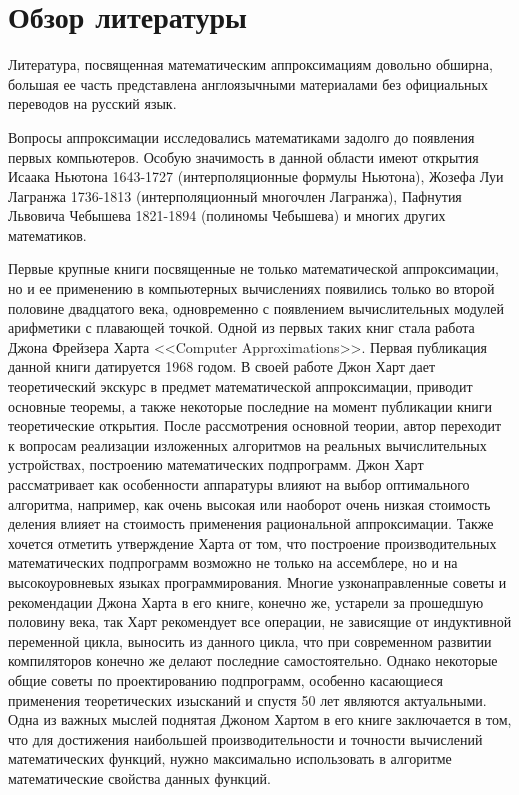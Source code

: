 \chapter{Обзор литературы}

Литература, посвященная математическим аппроксимациям довольно обширна, большая ее часть
представлена англоязычными материалами без официальных переводов на русский язык.

Вопросы аппроксимации исследовались математиками задолго до появления первых компьютеров.
Особую значимость в данной области имеют открытия Исаака Ньютона 1643-1727 (интерполяционные формулы
Ньютона), Жозефа Луи Лагранжа 1736-1813 (интерполяционный многочлен Лагранжа), Пафнутия Львовича
Чебышева 1821-1894 (полиномы Чебышева) и многих других математиков.

Первые крупные книги посвященные не только математической аппроксимации, но и ее применению
в компьютерных вычислениях появились только во второй половине двадцатого века, одновременно с
появлением вычислительных модулей арифметики с плавающей точкой. Одной из первых таких книг стала
работа Джона Фрейзера Харта <<\foreignlanguage{english}{Computer Approximations}>>\cite{hart}.
Первая публикация данной книги датируется 1968 годом.
В своей работе Джон Харт дает теоретический экскурс в предмет математической
аппроксимации, приводит основные теоремы, а также некоторые последние на момент публикации книги
теоретические открытия. После рассмотрения основной теории, автор переходит к вопросам реализации
изложенных алгоритмов на реальных вычислительных устройствах, построению математических подпрограмм.
Джон Харт рассматривает как особенности аппаратуры влияют на выбор оптимального алгоритма,
например, как очень высокая или наоборот очень низкая стоимость деления влияет на стоимость
применения рациональной
аппроксимации.
Также хочется отметить утверждение Харта от том, что построение производительных математических
подпрограмм возможно не только на ассемблере, но и на высокоуровневых языках программирования.
Многие узконаправленные советы и рекомендации Джона Харта в его книге, конечно же, устарели за
прошедшую половину века, так Харт рекомендует все операции, не зависящие от индуктивной переменной
цикла, выносить из данного цикла, что при современном развитии компиляторов конечно же делают последние
самостоятельно. Однако некоторые общие советы по проектированию подпрограмм, особенно касающиеся
применения теоретических изысканий и спустя 50 лет являются актуальными. Одна из важных мыслей поднятая
Джоном Хартом в его книге заключается в том, что для достижения наибольшей производительности и точности
вычислений математических функций, нужно максимально использовать в алгоритме математические свойства
данных функций.

